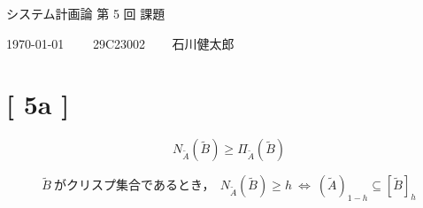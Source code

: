 \documentclass[uplatex, a4j, 10pt, fleqn, dvipdfmx]{article}
\begin{document}
\begin{center}
	{\Huge システム計画論 第 5 回 課題}
\end{center}

\begin{flushright}
	{\Large \today ~~~~ 29C23002 ~~~ 石川健太郎}
\end{flushright}

\section*{[ 5a ]}

\begin{equation}
	N_{\tilde{A}}(\tilde{B}) \geq \Pi_{\tilde{A}}(\tilde{B})
\end{equation}

\begin{equation}
	\tilde{B} ~ \text{がクリスプ集合であるとき，} ~~ N_{\tilde{A}}(\tilde{B}) \geq h ~ \Leftrightarrow ~ (\tilde{A})_{1-h} \subseteq [\tilde{B}]_h
\end{equation}
\end{document}
